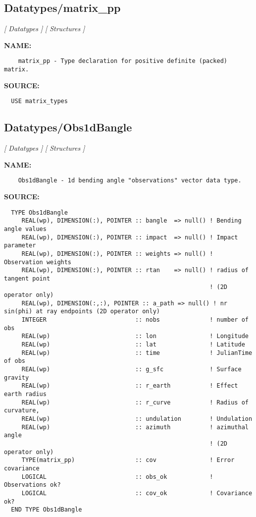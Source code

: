 \subsection{Datatypes/matrix\_pp}
\textsl{[ Datatypes ]}
\textsl{[ Structures ]}

\label{ch:robo35}
\label{ch:Datatypes_matrix_pp}
\textbf{NAME:}\hspace{0.08in}\begin{Verbatim}
    matrix_pp - Type declaration for positive definite (packed) matrix.
\end{Verbatim}
\textbf{SOURCE:}\hspace{0.08in}\begin{Verbatim}
  USE matrix_types
\end{Verbatim}
\subsection{Datatypes/Obs1dBangle}
\textsl{[ Datatypes ]}
\textsl{[ Structures ]}

\label{ch:robo36}
\label{ch:Datatypes_Obs1dBangle}
\textbf{NAME:}\hspace{0.08in}\begin{Verbatim}
    Obs1dBangle - 1d bending angle "observations" vector data type.
\end{Verbatim}
\textbf{SOURCE:}\hspace{0.08in}\begin{Verbatim}
  TYPE Obs1dBangle
     REAL(wp), DIMENSION(:), POINTER :: bangle  => null() ! Bending angle values
     REAL(wp), DIMENSION(:), POINTER :: impact  => null() ! Impact parameter
     REAL(wp), DIMENSION(:), POINTER :: weights => null() ! Observation weights
     REAL(wp), DIMENSION(:), POINTER :: rtan    => null() ! radius of tangent point
                                                          ! (2D operator only)
     REAL(wp), DIMENSION(:,:), POINTER :: a_path => null() ! nr sin(phi) at ray endpoints (2D operator only)
     INTEGER                         :: nobs              ! number of obs
     REAL(wp)                        :: lon               ! Longitude
     REAL(wp)                        :: lat               ! Latitude
     REAL(wp)                        :: time              ! JulianTime of obs
     REAL(wp)                        :: g_sfc             ! Surface gravity
     REAL(wp)                        :: r_earth           ! Effect earth radius
     REAL(wp)                        :: r_curve           ! Radius of curvature,
     REAL(wp)                        :: undulation        ! Undulation
     REAL(wp)                        :: azimuth           ! azimuthal angle
                                                          ! (2D operator only)
     TYPE(matrix_pp)                 :: cov               ! Error covariance
     LOGICAL                         :: obs_ok            ! Observations ok?
     LOGICAL                         :: cov_ok            ! Covariance ok?
  END TYPE Obs1dBangle
\end{Verbatim}
